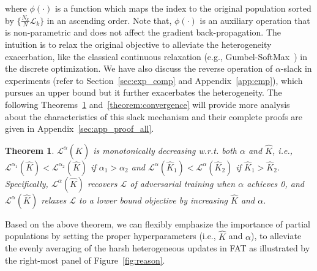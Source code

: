 \documentclass{article} %
\theoremstyle{plain}
\newtheorem{theorem}{Theorem}[section]
\theoremstyle{definition}
\theoremstyle{remark}
\begin{document}
where $\phi(\cdot)$ is a function which maps the index to the original population sorted by $\{\frac{N_k}{N}\mathcal{L}_k\}$ in an ascending order. Note that, $\phi(\cdot)$ is an auxiliary operation that is non-parametric and does not affect the gradient back-propagation. The intuition is to relax the original objective to alleviate the heterogeneity exacerbation, like the classical continuous relaxation (e.g., Gumbel-SoftMax~\citep{jang2017categorical}) in the discrete optimization. We have also discuss the reverse operation of $\alpha$-slack in experiments (refer to Section~\ref{sec:exp_comp} and Appendix~\ref{app:emp}), which pursues an upper bound but it further exacerbates the heterogeneity.
The following Theorems~\ref{theorem:characteristic} and~\ref{theorem:convergence} will provide more analysis about the characteristics of this slack mechanism and their complete proofs are given in Appendix~\ref{sec:app_proof_all}.
\begin{theorem} \label{theorem:characteristic}
$\mathcal{L}^\alpha(\widehat{K})$ is monotonically decreasing \textit{w.r.t.} both $\alpha$ and $\widehat{K}$, \textit{i.e.,} $\mathcal{L}^{\alpha_1}(\widehat{K})<\mathcal{L}^{\alpha_2}(\widehat{K})$ if $\alpha_1>\alpha_2$ and $\mathcal{L}^{\alpha}(\widehat{K}_1)<\mathcal{L}^{\alpha}(\widehat{K}_2)$ if $\widehat{K}_1>\widehat{K}_2$. Specifically, $\mathcal{L}^\alpha(\widehat{K})$ recovers $\mathcal{L}$ of adversarial training when $\alpha$ achieves 0, and $\mathcal{L}^\alpha(\widehat{K})$ relaxes $\mathcal{L}$ to a lower bound objective by increasing $\widehat{K}$ and $\alpha$.
\end{theorem}
Based on the above theorem, we can flexibly emphasize the importance of partial populations by setting the proper hyperparameters (i.e., $\widehat{K}$ and $\alpha$), to alleviate the evenly averaging of the harsh heterogeneous updates in FAT as illustrated by the right-most panel of Figure~\ref{fig:reason}.
\end{document}
